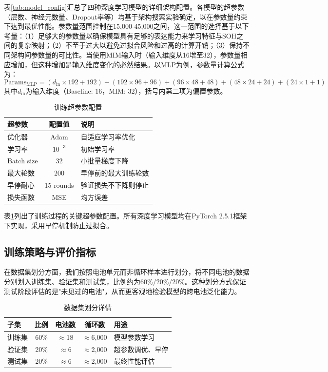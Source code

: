 \documentclass[10pt,a4paper]{ctexart}
\begin{document}
表\ref{tab:model_config}汇总了四种深度学习模型的详细架构配置。各模型的超参数（层数、神经元数量、Dropout率等）均基于架构搜索实验确定，以在参数量约束下达到最优性能。参数量范围控制在15,000-45,000之间，这一范围的选择基于以下考量：（1）足够大的参数量以确保模型具有足够的表达能力来学习特征与SOH之间的复杂映射；（2）不至于过大以避免过拟合风险和过高的计算开销；（3）保持不同架构间参数量的可比性。当使用MIM输入时（输入维度从16增至32），参数量相应增加，但这种增加是输入维度变化的必然结果。以MLP为例，参数量计算公式为：
\begin{equation}
    \text{Params}_{\text{MLP}} = (d_{\text{in}} \times 192 + 192) + (192 \times 96 + 96) + (96 \times 48 + 48) + (48 \times 24 + 24) + (24 \times 1 + 1)
\end{equation}
其中$d_{\text{in}}$为输入维度（Baseline: 16，MIM: 32），括号内第二项为偏置参数。

\begin{table}[H]
\centering
\caption{训练超参数配置}
\label{tab:training_config}
\begin{tabular}{@{}lcl@{}}
\toprule
\textbf{超参数} & \textbf{配置值} & \textbf{说明} \\
\midrule
优化器 & Adam & 自适应学习率优化 \\
学习率 & $10^{-3}$ & 初始学习率 \\
Batch size & 32 & 小批量梯度下降 \\
最大轮数 & 200 & 早停前的最大训练轮数 \\
早停耐心 & 15 rounds & 验证损失不下降则停止 \\
损失函数 & MSE & 均方误差 \\
\bottomrule
\end{tabular}
\end{table}

表\ref{tab:training_config}列出了训练过程的关键超参数配置。所有深度学习模型均在PyTorch 2.5.1框架下实现，采用早停机制防止过拟合。

\subsection{训练策略与评价指标}

在数据集划分方面，我们按照电池单元而非循环样本进行划分，将不同电池的数据分别划入训练集、验证集和测试集，比例约为60\%/20\%/20\%。这种划分方式保证测试阶段评估的是"未见过的电池"，从而更客观地检验模型的跨电池泛化能力。

\begin{table}[H]
\centering
\caption{数据集划分详情}
\label{tab:data_split}
\begin{tabular}{@{}lcccp{5cm}@{}}
\toprule
\textbf{子集} & \textbf{比例} & \textbf{电池数} & \textbf{循环数} & \textbf{用途} \\
\midrule
训练集 & 60\% & $\approx$18 & $\approx$6,000 & 模型参数学习 \\
验证集 & 20\% & $\approx$6 & $\approx$2,000 & 超参数调优、早停 \\
测试集 & 20\% & $\approx$6 & $\approx$2,000 & 最终性能评估 \\
\bottomrule
\end{tabular}
\end{table}
\end{document}
